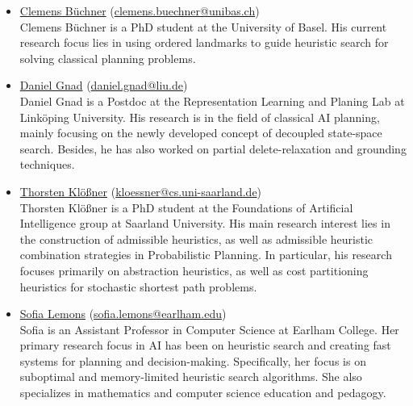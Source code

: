 \documentclass[10pt]{article}
\begin{document}
\newcommand{\organizer}[4]{\href{#2}{#1} (\href{mailto:#3}{#3})\\{#4}}
\begin{itemize}

\item \organizer{Clemens B\"uchner}{https://ai.dmi.unibas.ch/people/buechner/}{clemens.buechner@unibas.ch}
Clemens B\"uchner is a PhD student at the University of Basel. His current
research focus lies in using ordered landmarks to guide heuristic search for
solving classical planning problems.

\item \organizer{Daniel Gnad}{https://rlplab.com/daniel-gnad/}{daniel.gnad@liu.de}
Daniel Gnad is a Postdoc at the Representation Learning and Planing Lab at
Link\"oping University. His research is in the field of classical AI planning,
mainly focusing on the newly developed concept of decoupled state-space search.
Besides, he has also worked on partial delete-relaxation and grounding
techniques.

\item \organizer{Thorsten Kl\"o\ss{}ner}{http://fai.cs.uni-saarland.de/kloessner/}{kloessner@cs.uni-saarland.de}
Thorsten Kl\"o\ss{}ner is a PhD student at the Foundations of Artificial
Intelligence group at Saarland University. His main research interest lies in
the construction of admissible heuristics, as well as admissible heuristic
combination strategies in Probabilistic Planning. In particular, his research
focuses primarily on abstraction heuristics, as well as cost partitioning
heuristics for stochastic shortest path problems.

\item \organizer{Sofia Lemons}{https://earlham.edu/faculty-staff/sofia-lemons/}{sofia.lemons@earlham.edu}
Sofia is an Assistant Professor in Computer Science at Earlham College. Her primary research focus in AI has been on heuristic search and creating fast systems for planning and decision-making. Specifically, her focus is on suboptimal and memory-limited heuristic search algorithms. She also specializes in mathematics and computer science education and pedagogy.




\end{itemize}
\end{document}
